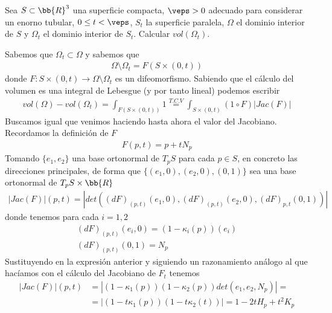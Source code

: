 \begin{ejemplo}
    Sea $S\subset \bb{R}^3$ una superficie compacta, $\veps>0$ adecuado para considerar un enorno tubular, $0\leq t < \veps$, $S_t$ la superficie paralela, $\Omega$ el dominio interior de $S$ y $\Omega_t$ el dominio interior de $S_t$. Calcular $vol(\Omega_t)$.\\

    \begin{solucion}
        Sabemos que $\Omega_t\subset \Omega$ y sabemos que
        \begin{gather*}
            \Omega \setminus \Omega_t = F(S\times(0,t))
        \end{gather*}
        donde $F:S\times(0,t) \to \Omega\setminus \Omega_t$ es un difeomorfismo. Sabiendo que el cálculo del volumen es una integral de Lebesgue (y por tanto lineal) podemos escribir 
        \begin{gather*}
            vol(\Omega) - vol(\Omega_t) = \int_{F(S\times(0,t))}1 \overset{T.C.V}{=} \int_{S\times(0,t)} (1\circ F)|Jac(F)|
        \end{gather*}
        Buscamos igual que venimos haciendo hasta ahora el valor del Jacobiano. Recordamos la definición de $F$
        \begin{gather*}
            F(p,t) = p + tN_p
        \end{gather*}
        Tomando $\{e_1, e_2\}$ una base ortonormal de $T_pS$ para cada $p\in S$, en concreto las direcciones principales, de forma que $\{(e_1, 0), (e_2, 0), (0,1)\}$ sea una base ortonormal de $T_pS\times \bb{R}$
        \begin{gather*}
            |Jac(F)| (p,t) = |det((dF)_{(p,t)}(e_1,0), (dF)_{(p,t)}(e_2, 0), (dF)_{p,t}(0,1))|
        \end{gather*}
        donde tenemos para cada $i=1,2$
        \begin{gather*}
            (dF)_{(p,t)}(e_i, 0) = (1-\kappa_i(p))(e_i)\\
            (dF)_{(p,t)}(0,1) = N_p
        \end{gather*}
        Sustituyendo en la expresión anterior y siguiendo un razonamiento análogo al que hacíamos con el cálculo del Jacobiano de $F_t$ tenemos
        \begin{align*}
            |Jac(F)| (p,t) &= 
            |(1-\kappa_1(p))(1-\kappa_2(p))det(e_1, e_2, N_p)| = \\
            &=
            |(1-t\kappa_1(p))(1-t\kappa_2(t))| = 1-2tH_p + t^2K_p 
        \end{align*}

\end{solucion}
\end{ejemplo}
